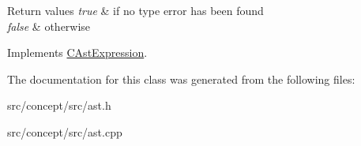 \begin{DoxyRetVals}{Return values}
{\em true} & if no type error has been found \\
\hline
{\em false} & otherwise \\
\hline
\end{DoxyRetVals}


Implements \hyperlink{classCAstExpression_a301baee7d5f700085371b706db8a3a56}{C\-Ast\-Expression}.



The documentation for this class was generated from the following files\-:\begin{DoxyCompactItemize}
\item 
src/concept/src/ast.\-h\item 
src/concept/src/ast.\-cpp\end{DoxyCompactItemize}
